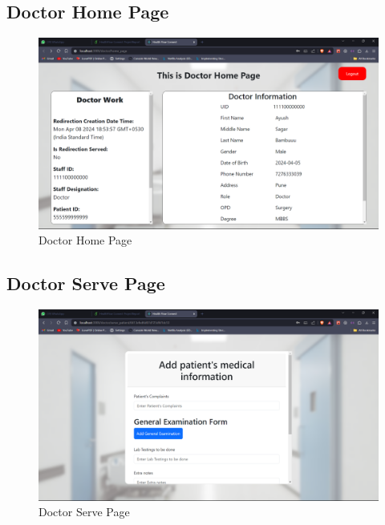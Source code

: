 \subsection{Doctor Home Page}
\begin{figure}[h!]
    \centering
    \includegraphics[width=\textwidth]{Doctor_Home_Page.png}
    \caption{Doctor Home Page}
\end{figure}
\subsection{Doctor Serve Page}
\begin{figure}[h!]
    \centering
    \includegraphics[width=\textwidth]{Doctor_Serve_Project.png}
    \caption{Doctor Serve Page}
\end{figure}

\clearpage
